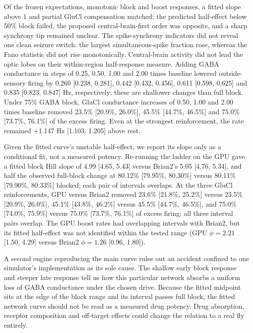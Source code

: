 \documentclass[11pt]{article}
\begin{document}
Of the frozen expectations, monotonic block and boost responses, a fitted slope above 1 and partial GluCl compensation matched; the predicted half-effect below 50\% block failed, the proposed central-brain-first order was opposite, and a sharp synchrony tip remained unclear. The spike-synchrony indicators did not reveal one clean seizure switch: the largest simultaneous-spike fraction rose, whereas the Fano statistic did not rise monotonically. Central-brain activity did not lead the optic lobes on their within-region half-response measure. Adding GABA conductance in steps of 0.25, 0.50, 1.00 and 2.00 times baseline lowered outside-sensory firing by 0.260 [0.238, 0.281], 0.442 [0.432, 0.456], 0.611 [0.598, 0.625] and 0.835 [0.823, 0.847] Hz, respectively; these are shallower changes than full block. Under 75\% GABA block, GluCl conductance increases of 0.50, 1.00 and 2.00 times baseline removed 23.5\% [20.9\%, 26.0\%], 45.5\% [44.7\%, 46.5\%] and 75.0\% [73.7\%, 76.1\%] of the excess firing. Even at the strongest reinforcement, the rate remained +1.147 Hz [1.103, 1.205] above rest.

Given the fitted curve's unstable half-effect, we report its slope only as a conditional fit, not a measured potency. Re-running the ladder on the GPU gave a fitted block Hill slope of 4.99 [4.65, 5.43] versus Brian2's 5.05 [4.76, 5.34], and half the observed full-block change at 80.12\% [79.95\%, 80.30\%] versus 80.11\% [79.90\%, 80.33\%] blocked; each pair of intervals overlaps. At the three GluCl reinforcements, GPU versus Brian2 removed 23.6\% [21.8\%, 25.2\%] versus 23.5\% [20.9\%, 26.0\%], 45.1\% [43.8\%, 46.2\%] versus 45.5\% [44.7\%, 46.5\%], and 75.0\% [74.0\%, 75.9\%] versus 75.0\% [73.7\%, 76.1\%] of excess firing; all three interval pairs overlap. The GPU boost rates had overlapping intervals with Brian2, but its fitted half-effect was not identified within the tested range (GPU $\phi=2.21$ [1.50, 4.29] versus Brian2 $\phi=1.26$ [0.96, 1.80]).

A second engine reproducing the main curve rules out an accident confined to one simulator's implementation as its sole cause. The shallow early block response and steeper late response tell us how this particular network absorbs a uniform loss of GABA conductance under the chosen drive. Because the fitted midpoint sits at the edge of the block range and its interval passes full block, the fitted network curve should not be read as a measured drug potency. Drug absorption, receptor composition and off-target effects could change the relation to a real fly entirely.
\end{document}
